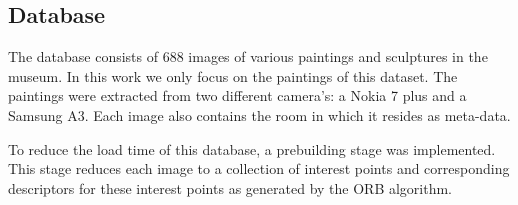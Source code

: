 	\subsection{Database}
	The database consists of 688 images of various paintings and sculptures in the museum. In this work we only focus on the paintings of this dataset. The paintings were extracted from two different camera's: a Nokia 7 plus and a Samsung A3. Each image also contains the room in which it resides as meta-data.  

	To reduce the load time of this database, a prebuilding stage was implemented. This stage reduces each image to a collection of interest points and corresponding descriptors for these interest points as generated by the ORB \cite{Rublee2011} algorithm. 